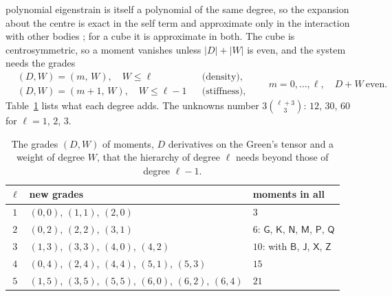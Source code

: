 \documentclass[11pt,a4paper]{article}
\begin{document}
polynomial eigenstrain is itself a polynomial of the same degree, so the expansion about the centre is
exact in the self term and approximate only in the interaction with other bodies \citep{Brisard2014};
for a cube it is approximate in both. The cube is centrosymmetric, so a moment vanishes unless $|D|+|W|$ is even, and the system
needs the grades
\begin{equation}\label{eq:grades}
\begin{aligned}
  &(D,W)=(m,\,W),\quad W\le\ell &&\text{(density)},\\
  &(D,W)=(m+1,\,W),\quad W\le\ell-1 &&\text{(stiffness)},
\end{aligned}
  \qquad m=0,\dots,\ell,\quad D+W\ \text{even}.
\end{equation}
Table~\ref{tab:grades} lists what each degree adds. The unknowns number
$3\binom{\ell+3}{3}$: $12$, $30$, $60$ for $\ell=1$, $2$, $3$.
\begin{table}[htbp]
\centering
\caption{The grades $(D,W)$ of moments, $D$ derivatives on the Green's tensor and a weight of degree
$W$, that the hierarchy of degree $\ell$ needs beyond those of degree $\ell-1$.}\label{tab:grades}
\small
\begin{tabular}{@{}cll@{}}
\toprule
$\ell$ & new grades & moments in all \\
\midrule
$1$ & $(0,0)$, $(1,1)$, $(2,0)$ & $3$ \\
$2$ & $(0,2)$, $(2,2)$, $(3,1)$ & $6$: $\mathsf G$, $\mathsf K$, $\mathsf N$, $\mathsf M$, $\mathsf P$, $\mathsf Q$ \\
$3$ & $(1,3)$, $(3,3)$, $(4,0)$, $(4,2)$ & $10$: with $\mathsf B$, $\mathsf J$, $\mathsf X$, $\mathsf Z$ \\
$4$ & $(0,4)$, $(2,4)$, $(4,4)$, $(5,1)$, $(5,3)$ & $15$ \\
$5$ & $(1,5)$, $(3,5)$, $(5,5)$, $(6,0)$, $(6,2)$, $(6,4)$ & $21$ \\
\bottomrule
\end{tabular}
\end{table}
\end{document}
